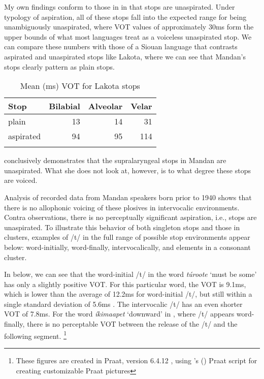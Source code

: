 My own findings conform to those in \citet{torres2013a} in that stops are unaspirated. Under  typology of aspiration, all of these stops fall into the expected range for being unambiguously unaspirated, where VOT values of approximately 30ms form the upper bounds of what most languages treat as a voiceless unaspirated stop. We can compare these numbers with those of a Siouan language that contrasts aspirated and unaspirated stops like Lakota, where we can see that Mandan's stops clearly pattern as plain stops.

\begin{table}
\caption{Mean (ms) VOT for Lakota stops \citep{torres2013b}}
\label{torresVOT2}
\begin{tabular}{lrrr}
\lsptoprule
{Stop}			&	{Bilabial}	&	{Alveolar}	&	{Velar}\\
\midrule
{plain}			&	13				&	14				&	31\\
{aspirated}	    &	94				&	95				&	114\\
\lspbottomrule
\end{tabular}

\end{table}

\citet{torres2013a,torres2013b} conclusively demonstrates that the supralaryngeal stops in Mandan are unaspirated. What she does not look at, however, is to what degree these stops are voiced.

Analysis of recorded data from Mandan speakers born prior to 1940 shows that there is no allophonic voicing of these plosives in intervocalic environments. Contra  observations, there is no perceptually significant aspiration, i.e., stops are unaspirated. To illustrate this behavior of both singleton stops and those in clusters, examples of /t/ in the full range of possible stop environments appear below: word-initially, word-finally, intervocalically, and elements in a consonant cluster.

In  below, we can see that the word-initial /t/ in the word \textit{túroote} `must be some' has only a slightly positive VOT. For this particular word, the VOT is 9.1ms, which is lower than the average of 12.2ms for word-initial /t/, but still within a single standard deviation of 5.6ms \citep[29]{torres2013a}. The intervocalic /t/ has an even shorter VOT of 7.8ms. For the word \textit{íkimaapet} `downward' in , where /t/ appears word-finally, there is no perceptable VOT between the release of the /t/ and the following segment. %
\footnote{These figures are created in Praat, version 6.4.12 \citep{boersmaweenik2016}, using \citeauthor{garcia2022}'s (\citeyear{garcia2022}) Praat script for creating customizable Praat pictures}

